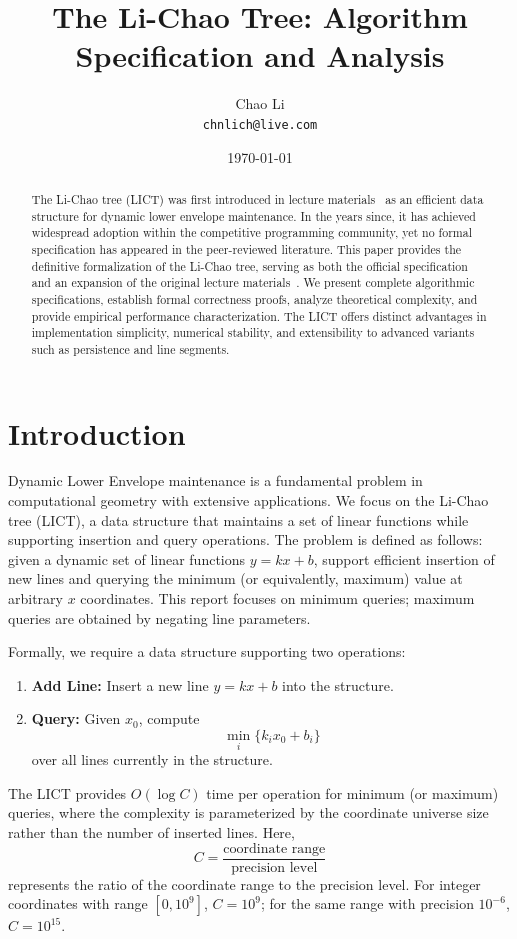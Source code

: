 \documentclass[11pt,a4paper]{article}
\title{\textbf{The Li-Chao Tree: Algorithm Specification and Analysis}}
\author{Chao Li \\ \texttt{chnlich@live.com}}
\date{\today}
\theoremstyle{definition}
\theoremstyle{plain}
\begin{document}
\maketitle

\begin{abstract}
The Li-Chao tree (LICT) was first introduced in lecture materials~\cite{lichao2012} as an efficient data structure for dynamic lower envelope maintenance. In the years since, it has achieved widespread adoption within the competitive programming community, yet no formal specification has appeared in the peer-reviewed literature. This paper provides the definitive formalization of the Li-Chao tree, serving as both the official specification and an expansion of the original lecture materials~\cite{lichao2012}. We present complete algorithmic specifications, establish formal correctness proofs, analyze theoretical complexity, and provide empirical performance characterization. The LICT offers distinct advantages in implementation simplicity, numerical stability, and extensibility to advanced variants such as persistence and line segments.
\end{abstract}

\section{Introduction}

Dynamic Lower Envelope maintenance is a fundamental problem in computational geometry with extensive applications. We focus on the Li-Chao tree (LICT), a data structure that maintains a set of linear functions while supporting insertion and query operations. The problem is defined as follows: given a dynamic set of linear functions $y = kx + b$, support efficient insertion of new lines and querying the minimum (or equivalently, maximum) value at arbitrary $x$ coordinates. This report focuses on minimum queries; maximum queries are obtained by negating line parameters.

Formally, we require a data structure supporting two operations:
\begin{enumerate}
\item \textbf{Add Line:} Insert a new line $y = kx + b$ into the structure.
\item \textbf{Query:} Given $x_0$, compute
\[
\min_{i} \{k_i x_0 + b_i\}
\]
over all lines currently in the structure.
\end{enumerate}

The LICT provides $O(\log C)$ time per operation for minimum (or maximum) queries, where the complexity is parameterized by the coordinate universe size rather than the number of inserted lines.  Here,
\[
C = \frac{\text{coordinate range}}{\text{precision level}}
\]
represents the ratio of the coordinate range to the precision level.
For integer coordinates with range $[0, 10^9]$, $C = 10^9$; for the same range with precision $10^{-6}$, $C = 10^{15}$.
\end{document}

